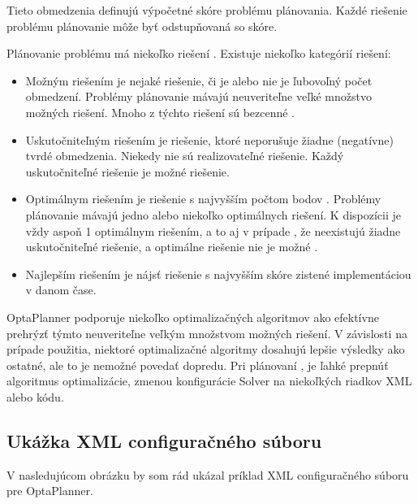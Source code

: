Tieto obmedzenia definujú výpočetné skóre problému plánovania. Každé riešenie problému plánovanie môže byť odstupňovaná so skóre. 

Plánovanie problému má niekoľko riešení . Existuje niekoľko kategórií riešení:
\begin{itemize}
\item Možným riešením je nejaké riešenie, či je alebo nie je ľubovoľný počet obmedzení. Problémy plánovanie mávajú neuveriteľne veľké množstvo možných riešení. Mnoho z týchto riešení sú bezcenné .
\item Uskutočniteľným riešením je riešenie, ktoré neporušuje žiadne (negatívne) tvrdé obmedzenia. Niekedy nie sú realizovateľné riešenie. Každý uskutočniteľné riešenie je možné riešenie.

\item Optimálnym riešením je riešenie s najvyšším počtom bodov . Problémy plánovanie mávajú jedno alebo niekoľko optimálnych riešení. K dispozícii je vždy aspoň 1 optimálnym riešením, a to aj v prípade , že neexistujú žiadne uskutočniteľné riešenie, a optimálne riešenie nie je možné .
\item Najlepším riešením je nájsť riešenie s najvyšším skóre zistené implementáciou v danom čase.

\end{itemize}

OptaPlanner podporuje niekoľko optimalizačných algoritmov ako efektívne prehrýzť týmto neuveriteľne veľkým množstvom možných riešení. V závislosti na prípade použitia, niektoré optimalizačné algoritmy dosahujú lepšie výsledky ako ostatné, ale to je nemožné povedať dopredu. Pri plánovaní , je ľahké prepnúť algoritmus optimalizácie, zmenou konfigurácie Solver na niekoľkých riadkov XML alebo kódu.


\newpage
\subsection{Ukážka XML configuračného súboru}
V nasledujúcom obrázku by som rád ukázal príklad XML configuračného súboru pre OptaPlanner.
    

